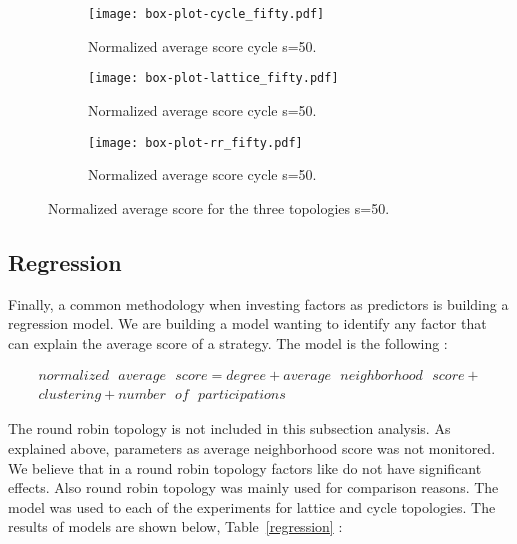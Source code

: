 \begin{figure}[H]
\centering
    \begin{subfigure}[t]{1\textwidth}
    \centering
        \texttt{[image: box-plot-cycle\_fifty.pdf]}
    \caption{Normalized average score cycle s=50.}
    \end{subfigure}
\hfill
    \begin{subfigure}[t]{1\textwidth}\centering
    \centering
        \texttt{[image: box-plot-lattice\_fifty.pdf]}
    \caption{Normalized average score cycle s=50.}
    \end{subfigure}
\hfill
    \begin{subfigure}[t]{1\textwidth}\centering
    \centering
        \texttt{[image: box-plot-rr\_fifty.pdf]}
    \caption{Normalized average score cycle s=50.}
    \end{subfigure}
\caption{Normalized average score for the three topologies s=50.}
\label{fig:average-score-fifty}
\end{figure}

\subsection{Regression}

Finally, a common methodology when investing factors as predictors is building a
regression model. We are building
a model wanting to identify any factor that can explain the average score of a
strategy. The model is the following :

\begin{equation}\label{regmodel}
\begin{split}
normalized\textrm{ }average\textrm{ }score = degree + average\textrm{ }neighborhood\textrm{ }score + \\
clustering + number\textrm{ }of\textrm{ }participations
\end{split}
\end{equation}

The round robin topology is not included in this subsection analysis. As explained
above, parameters as average neighborhood score was not monitored. We believe
that in a round robin topology factors like do not have significant effects.
Also round robin topology was mainly used for comparison reasons.
The model was used to each of the experiments for lattice and cycle topologies.
The results of models are shown below, Table~\ref{regression} :

